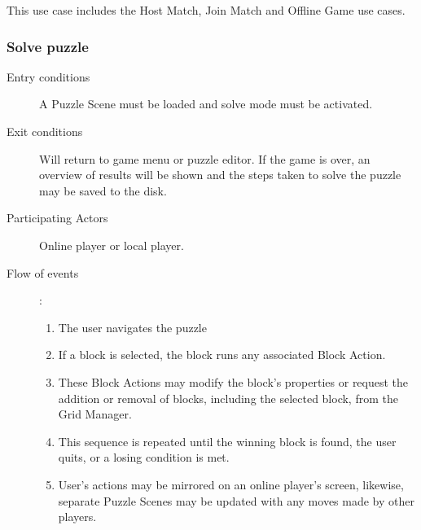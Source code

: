 \documentclass[12pt]{article}
\begin{document}
\begin{mdframed}
    This use case includes the Host Match, Join Match and Offline Game
    use cases.
    \subsubsection{Solve puzzle}
    \begin{description}
        \item[Entry conditions] A Puzzle Scene must be loaded and solve mode
            must be activated.
        \item[Exit conditions] Will return to game menu or puzzle editor.
            If the game is over, an overview of results will be shown and the
            steps taken to solve the puzzle may be saved to the disk.
        \item[Participating Actors] Online player or local player.
        \item[Flow of events]:
            \begin{enumerate}
                \item The user navigates the puzzle
                \item If a block is selected, the block runs any associated
                    Block Action.
                \item These Block Actions may modify the block's properties or
                    request the addition or removal of blocks, including the
                    selected block, from the Grid Manager.
                \item This sequence is repeated until the winning block is
                    found, the user quits, or a losing condition is met.
                \item User's actions may be mirrored on an online player's
                    screen, likewise, separate Puzzle Scenes  may be updated
                    with any moves made by other players.
            \end{enumerate}
    \end{description}
\end{mdframed}
\end{document}
